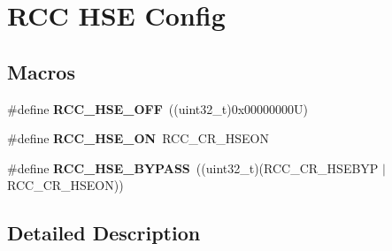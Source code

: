 \hypertarget{group___r_c_c___h_s_e___config}{}\section{R\+CC H\+SE Config}
\label{group___r_c_c___h_s_e___config}
\subsection*{Macros}
\begin{DoxyCompactItemize}
\item 
\mbox{\label{group___r_c_c___h_s_e___config_ga1616626d23fbce440398578855df6f97}} 
\#define {\bfseries R\+C\+C\+\_\+\+H\+S\+E\+\_\+\+O\+FF}~((uint32\+\_\+t)0x00000000\+U)
\item 
\mbox{\label{group___r_c_c___h_s_e___config_gabc4f70a44776c557af20496b04d9a9db}} 
\#define {\bfseries R\+C\+C\+\_\+\+H\+S\+E\+\_\+\+ON}~R\+C\+C\+\_\+\+C\+R\+\_\+\+H\+S\+E\+ON
\item 
\mbox{\label{group___r_c_c___h_s_e___config_ga5ca515db2d5c4d5bdb9ee3d154df2704}} 
\#define {\bfseries R\+C\+C\+\_\+\+H\+S\+E\+\_\+\+B\+Y\+P\+A\+SS}~((uint32\+\_\+t)(R\+C\+C\+\_\+\+C\+R\+\_\+\+H\+S\+E\+B\+YP $\vert$ R\+C\+C\+\_\+\+C\+R\+\_\+\+H\+S\+E\+ON))
\end{DoxyCompactItemize}


\subsection{Detailed Description}
